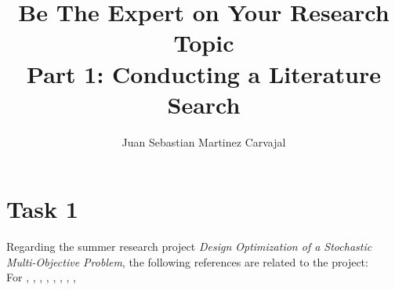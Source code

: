 \documentclass{journal}
\title{\textbf{Be The Expert on Your Research Topic}\\Part 1: Conducting a Literature Search}
\author{Juan Sebastian Martinez Carvajal}
\date{}
\begin{document}
\maketitle
\hrulefill

\section{Task 1}
Regarding the summer research project \textit{Design Optimization of a Stochastic Multi-Objective Problem}, the following references are related to the project:\\





For \cite{Seeger2004}, \cite{Constantine2014}, \cite{Bilionis2016}, \cite{Costa2006}, \cite{davidson2014probabilistic}, \cite{Li2014}, \cite{Guo2007}, \cite{Schaul2011}, \cite{Wang2016}
\end{document}
